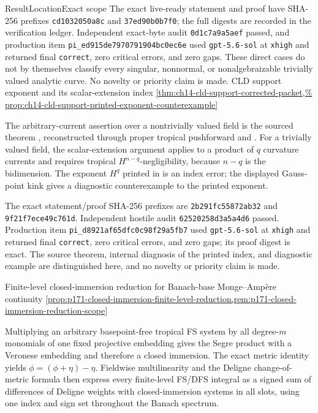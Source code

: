 \begin{AppLProvenanceLedger}{Result}{Location}{Exact scope}
{   The exact live-ready statement and proof have SHA-256 prefixes
   \texttt{cd1032050a8c} and \texttt{37ed90b0b7f0}; the full
   digests are recorded in the verification ledger.  Independent exact-byte
   audit \texttt{0d1c7a9a5aef}
   passed, and production item
   \nolinkurl{pi_ed915de7970791904bc0ec6e} used
   \texttt{gpt-5.6-sol} at \texttt{xhigh} and returned final
   \texttt{correct}, zero critical errors, and zero gaps.  These direct cases
   do not by themselves classify every singular, nonnormal, or
   nonalgebraizable trivially valued analytic curve.  No novelty or priority
   claim is made.}
\AppLProvenanceRecord
  {CLD support exponent and its scalar-extension index}
  {\cref{thm:ch14-cld-support-corrected-packet,%
   prop:ch14-cld-support-printed-exponent-counterexample}}
  {The arbitrary-current assertion over a nontrivially valued field is the
   sourced theorem \cite[Theorem~16.8.5]{CLD25}, reconstructed through proper
   tropical pushforward and
   \cite[Corollary~4.1]{Lag12Super}.  For a trivially valued field, the
   scalar-extension argument applies to a product of \(q\) curvature currents
   and requires tropical \(H^{n-q}\)-negligibility, because \(n-q\) is the
   bidimension.  The exponent \(H^q\) printed in
   \cite[Corollary~16.8.6]{CLD25} is an index error; the displayed Gauss-point
   kink gives a diagnostic counterexample to the printed exponent.

   The exact statement/proof SHA-256 prefixes are
   \texttt{2b291fc55872ab32} and \texttt{9f21f7ece49c761d}.  Independent
   hostile audit \texttt{62520258d3a5a4d6} passed.  Production item
   \nolinkurl{pi_d8921af65dfc0c98f29a5fb7} used
   \texttt{gpt-5.6-sol} at \texttt{xhigh} and returned final
   \texttt{correct}, zero critical errors, and zero gaps; its proof digest is
   exact.  The source theorem, internal diagnosis of the printed index, and
   diagnostic example are distinguished here, and no novelty or priority
   claim is made.}
\AppLProvenanceRecord
  {Finite-level closed-immersion reduction for Banach-base
   Monge--Amp\`ere continuity}
  {\cref{prop:p171-closed-immersion-finite-level-reduction,rem:p171-closed-immersion-reduction-scope}}
  {Multiplying an arbitrary basepoint-free tropical FS system by all
   degree-\(m\) monomials of one fixed projective embedding gives the Segre
   product with a Veronese embedding and therefore a closed immersion.  The
   exact metric identity yields \(\phi=(\phi+\eta)-\eta\).  Fieldwise
   multilinearity and the Deligne change-of-metric formula then express every
   finite-level FS/DFS integral as a signed sum of differences of Deligne
   weights with closed-immersion systems in all slots, using one index and
   sign set throughout the Banach spectrum.

}
\end{AppLProvenanceLedger}
